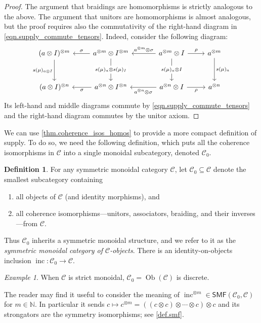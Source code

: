 \documentclass[11pt, oneside, article]{memoir}
\theoremstyle{plain}
\theoremstyle{definition}
\newtheorem{definition}[theorem]{Definition}
\theoremstyle{remark}
\newtheorem{example}[theorem]{Example}
\newcommand{\Set}[1]{\mathrm{#1}}%
\newcommand{\cat}[1]{\mathcal{#1}}%
\newcommand{\Cat}[1]{{\mathsf{#1}}}%
\DeclareMathOperator{\ob}{\Set{Ob}}
\DeclareMathOperator{\inc}{inc}
\newcommand{\tpow}[1]{^{\otimes #1}}
\newcommand{\smf}{\Cat{SMF}}
\newcommand{\nn}{\mathbb{N}}
\newcommand{\mob}[1]{#1_0}
\renewcommand{\ss}{\subseteq}
\begin{document}
\begin{proof}
The argument that braidings are homomorphisms is strictly analogous to the above. The argument that unitors are homomorphisms is almost analogous, but the proof requires also the commutativity of the right-hand diagram in \cref{eqn.supply_commute_tensors}. Indeed, consider the following diagram:
\[
\begin{tikzcd}[row sep=30pt]
	(a\otimes I)\tpow{m}\ar[d, "s(\mu)_{a\otimes I}"']&
	a\tpow{m}\otimes I\tpow{m}\ar[d, "s(\mu)_a\otimes s(\mu)_I" description]\ar[l, "\sigma"']&[10pt]
	a\tpow{m}\otimes I\ar[d, "s(\mu)_a\otimes I" description]\ar[r, "\rho"]\ar[l, "a\tpow{m}\otimes\sigma"']&
	a\tpow{m}\ar[d, "s(\mu)_a"]\\
	(a\otimes I)\tpow{n}&
	a\tpow{n}\otimes I\tpow{n}\ar[l, "\sigma"]&
	a\tpow{n}\otimes I\ar[l, "a\tpow{n}\otimes\sigma"]\ar[r, "\rho"']&
	a\tpow{n}
\end{tikzcd}
\]
Its left-hand and middle diagrams commute by \cref{eqn.supply_commute_tensors} and the right-hand diagram commutes by the unitor axiom.
\end{proof}

We can use \cref{thm.coherence_isos_homos} to provide a more compact definition of supply. To do so, we need the following definition, which puts all the coherence isomorphisms in $\cat{C}$ into a single monoidal subcategory, denoted $\mob{\cat{C}}$.

\begin{definition}\label{def.mob}
For any symmetric monoidal category $\cat{C}$, let $\mob{\cat{C}}\ss\cat{C}$ denote the smallest subcategory containing
\begin{enumerate}[label=(\roman*)]
	\item all objects of $\cat{C}$ (and identity morphisms), and
	\item all coherence isomorphisms---unitors, associators, braiding, and their inverses---from $\cat{C}$.
\end{enumerate}
Thus $\mob{\cat{C}}$ inherits a symmetric monoidal structure, and we refer to it as the \emph{symmetric monoidal category of $\cat{C}$-objects}. There is an identity-on-objects inclusion $\inc\colon\mob{\cat{C}}\to\cat{C}$. 
\end{definition}

\begin{example}
When $\cat{C}$ is strict monoidal, $\mob{\cat{C}}=\ob(\cat{C})$ is discrete.
\end{example}

The reader may find it useful to consider the meaning of $\inc\tpow{m}\in\smf(\mob{\cat{C}},\cat{C})$ for $m\in\nn$. In particular it sends $c\mapsto c\tpow{m}=((c\otimes c)\otimes\cdots\otimes c)\otimes c$ and its strongators are the symmetry isomorphisms; see \cref{def.smf}.
\end{document}
